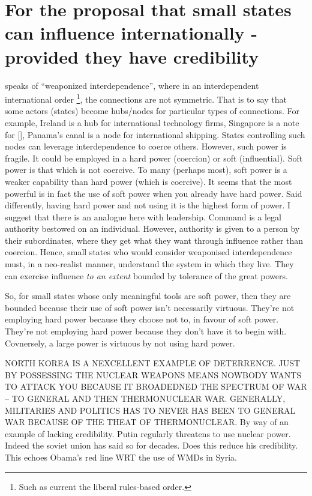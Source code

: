 \chapter{For the proposal that small states can influence internationally - provided they have credibility}

\textcite{FARRELL_2019} speaks of ``weaponized interdependence'', where in an interdependent international order \footnote{Such as current the liberal rules-based order.}, the connections are not symmetric. That is to say that some actors (states) become hubs/nodes for particular types of connections. For example, Ireland is a hub for international technology firms, Singapore is a note for [], Panama's canal is a node for international shipping. States controlling such nodes can leverage interdependence to coerce others. However, such power is fragile. It could be employed in a hard power (coercion) or soft (influential). Soft power is that which is not coercive. To many (perhaps most), soft power is a weaker capability than hard power (which is coercive). It seems that the most powerful is in fact the use of soft power when you already have hard power. Said differently, having hard power and not using it is the highest form of power. I suggest that there is an analogue here with leadership. Command is a legal authority bestowed on an individual. However, authority is given to a person by their subordinates, where they get what they want through influence rather than coercion. Hence, small states who would consider weaponised interdependence must, in a neo-realist manner, understand the system in which they live. They can exercise influence \textit{to an extent} bounded by tolerance of the great powers.

So, for small states whose only meaningful tools are soft power, then they are bounded because their use of soft power isn't necessarily virtuous. They're not employing hard power because they choose not to, in favour of soft power. They're not employing hard power because they don't have it to begin with. Covnersely, a large power is virtuous by not using hard power.



NORTH KOREA IS A NEXCELLENT EXAMPLE OF DETERRENCE. JUST BY POSSESSING THE NUCLEAR WEAPONS MEANS NOWBODY WANTS TO ATTACK YOU BECAUSE IT BROADEDNED THE SPECTRUM OF WAR – TO GENERAL AND THEN THERMONUCLEAR WAR. GENERALLY, MILITARIES AND POLITICS HAS TO NEVER HAS BEEN TO GENERAL WAR BECAUSE OF THE THEAT OF THERMONUCLEAR. By way of an example of lacking credibility. Putin regularly threatens to use nuclear power. Indeed the soviet union has said so for decades. Does this reduce his credibility. This echoes Obama’s red line WRT the use of WMDs  in Syria.

